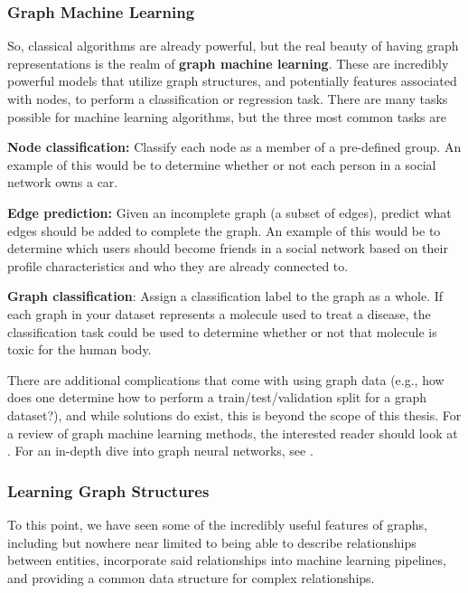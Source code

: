 \documentclass[12pt]{article}
\theoremstyle{definition}
\begin{document}
\subsubsection{Graph Machine Learning}

So, classical algorithms are already powerful, but the real beauty of having graph representations is the realm of \textbf{graph machine learning}. These are incredibly powerful models that utilize graph structures, and potentially features associated with nodes, to perform a classification or regression task. There are many tasks possible for machine learning algorithms, but the three most common tasks are

\textbf{Node classification:} Classify each node as a member of a pre-defined group. An example of this would be to determine whether or not each person in a social network owns a car.

\textbf{Edge prediction:} Given an incomplete graph (a subset of edges), predict what edges should be added to complete the graph. An example of this would be to determine which users should become friends in a social network based on their profile characteristics and who they are already connected to.

\textbf{Graph classification}: Assign a classification label to the graph as a whole. If each graph in your dataset represents a molecule used to treat a disease, the classification task could be used to determine whether or not that molecule is toxic for the human body.

There are additional complications that come with using graph data (e.g., how does one determine how to perform a train/test/validation split for a graph dataset?), and while solutions do exist, this is beyond the scope of this thesis. For a review of graph machine learning methods, the interested reader should look at \cite{graphMLSurvey}. For an in-depth dive into graph neural networks, see \cite{GNNsurvey}.

\subsubsection{Learning Graph Structures}
\label{subsubsec:learningGraphStructures}

To this point, we have seen some of the incredibly useful features of graphs, including but nowhere near limited to being able to describe relationships between entities, incorporate said relationships into machine learning pipelines, and providing a common data structure for complex relationships.
\end{document}
